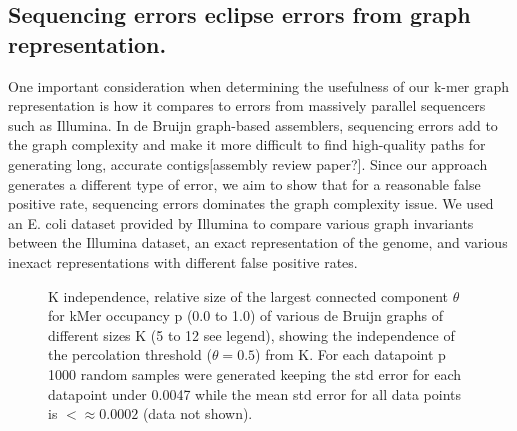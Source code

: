 \documentclass[12pt]{article} \usepackage{simplemargins}
\begin{document}
\subsection{Sequencing errors eclipse errors from graph representation.} One
important consideration when determining the usefulness of our k-mer
graph representation is how it compares to errors from massively
parallel sequencers such as Illumina. In de Bruijn graph-based
assemblers, sequencing errors add to the graph complexity and make it
more difficult to find high-quality paths for generating long,
accurate contigs[assembly review paper?]. Since our approach generates
a different type of error, we aim to show that for a reasonable false
positive rate, sequencing errors dominates the graph complexity
issue. We used an E. coli dataset provided by Illumina to compare
various graph invariants between the Illumina dataset, an exact
representation of the genome, and various inexact representations with
different false positive rates.

\begin{figure}

\caption{K independence, relative size of the largest connected component
$\theta$ for kMer occupancy p (0.0 to 1.0) of various de Bruijn graphs of
different sizes K (5 to 12 see legend), showing the independence of the
percolation threshold ($\theta = 0.5$) from K.
For each datapoint p 1000 random samples were generated keeping the std error
for each datapoint under 0.0047 while the mean std error for all data points is
$< \approx 0.0002$ (data not shown).}
\end{figure}
\end{document}

